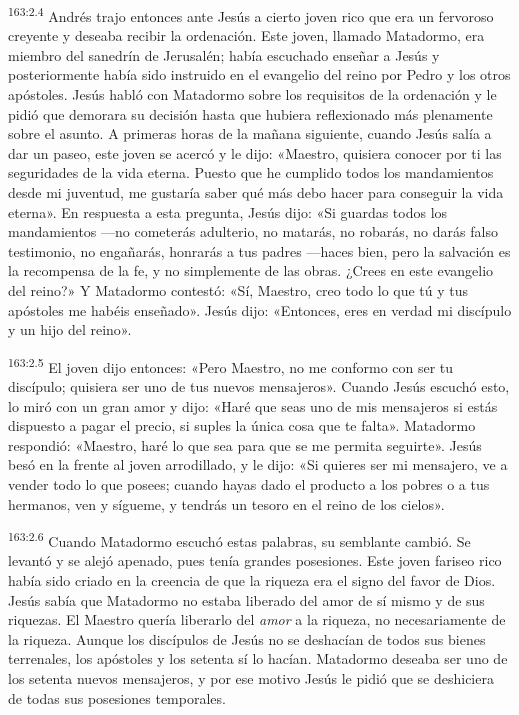 \par 
\textsuperscript{163:2.4} Andrés trajo entonces ante Jesús a cierto joven rico que era un fervoroso creyente y deseaba recibir la ordenación. Este joven, llamado Matadormo, era miembro del sanedrín de Jerusalén; había escuchado enseñar a Jesús y posteriormente había sido instruido en el evangelio del reino por Pedro y los otros apóstoles. Jesús habló con Matadormo sobre los requisitos de la ordenación y le pidió que demorara su decisión hasta que hubiera reflexionado más plenamente sobre el asunto. A primeras horas de la mañana siguiente, cuando Jesús salía a dar un paseo, este joven se acercó y le dijo: «Maestro, quisiera conocer por ti las seguridades de la vida eterna. Puesto que he cumplido todos los mandamientos desde mi juventud, me gustaría saber qué más debo hacer para conseguir la vida eterna». En respuesta a esta pregunta, Jesús dijo: «Si guardas todos los mandamientos ---no cometerás adulterio, no matarás, no robarás, no darás falso testimonio, no engañarás, honrarás a tus padres ---haces bien, pero la salvación es la recompensa de la fe, y no simplemente de las obras. ¿Crees en este evangelio del reino?» Y Matadormo contestó: «Sí, Maestro, creo todo lo que tú y tus apóstoles me habéis enseñado». Jesús dijo: «Entonces, eres en verdad mi discípulo y un hijo del reino».

\par 
\textsuperscript{163:2.5} El joven dijo entonces: «Pero Maestro, no me conformo con ser tu discípulo; quisiera ser uno de tus nuevos mensajeros». Cuando Jesús escuchó esto, lo miró con un gran amor y dijo: «Haré que seas uno de mis mensajeros si estás dispuesto a pagar el precio, si suples la única cosa que te falta». Matadormo respondió: «Maestro, haré lo que sea para que se me permita seguirte». Jesús besó en la frente al joven arrodillado, y le dijo: «Si quieres ser mi mensajero, ve a vender todo lo que posees; cuando hayas dado el producto a los pobres o a tus hermanos, ven y sígueme, y tendrás un tesoro en el reino de los cielos».

\par 
\textsuperscript{163:2.6} Cuando Matadormo escuchó estas palabras, su semblante cambió. Se levantó y se alejó apenado, pues tenía grandes posesiones. Este joven fariseo rico había sido criado en la creencia de que la riqueza era el signo del favor de Dios. Jesús sabía que Matadormo no estaba liberado del amor de sí mismo y de sus riquezas. El Maestro quería liberarlo del \textit{amor} a la riqueza, no necesariamente de la riqueza. Aunque los discípulos de Jesús no se deshacían de todos sus bienes terrenales, los apóstoles y los setenta sí lo hacían. Matadormo deseaba ser uno de los setenta nuevos mensajeros, y por ese motivo Jesús le pidió que se deshiciera de todas sus posesiones temporales.

